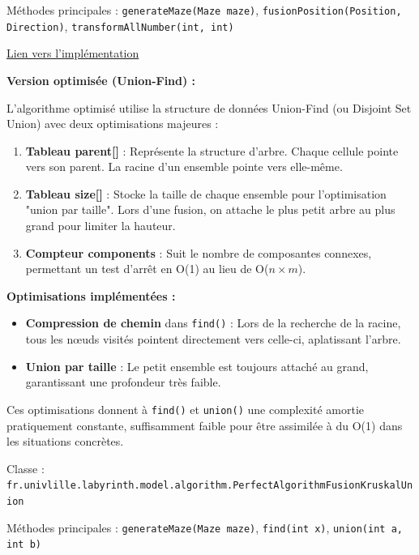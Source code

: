 \documentclass{butexFR}
\begin{document}
Méthodes principales : \texttt{generateMaze(Maze maze)}, \texttt{fusionPosition(Position, Direction)}, \texttt{transformAllNumber(int, int)}

\href{https://gitlab.univ-lille.fr/sae302/2025/G2_SAE3.3/-/blob/master/labyrinth/src/main/java/fr/univlille/labyrinth/model/algorithm/PerfectAlgorithmRandomFusion.java?ref_type=heads}{Lien vers l'implémentation}

\textbf{Version optimisée (Union-Find) :}

L'algorithme optimisé utilise la structure de données Union-Find (ou Disjoint Set Union) avec deux optimisations majeures :

\begin{enumerate}
    \item \textbf{Tableau parent[]} : Représente la structure d'arbre. Chaque cellule pointe vers son parent. La racine d'un ensemble pointe vers elle-même.

    \item \textbf{Tableau size[]} : Stocke la taille de chaque ensemble pour l'optimisation "union par taille". Lors d'une fusion, on attache le plus petit arbre au plus grand pour limiter la hauteur.

    \item \textbf{Compteur components} : Suit le nombre de composantes connexes, permettant un test d'arrêt en O(1) au lieu de O($n \times m$).
\end{enumerate}

\textbf{Optimisations implémentées :}
\begin{itemize}
    \item \textbf{Compression de chemin} dans \texttt{find()} : Lors de la recherche de la racine, tous les nœuds visités pointent directement vers celle-ci, aplatissant l'arbre.

    \item \textbf{Union par taille} : Le petit ensemble est toujours attaché au grand, garantissant une profondeur très faible.
\end{itemize}

Ces optimisations donnent à \texttt{find()} et \texttt{union()} une complexité amortie pratiquement constante, suffisamment faible pour être assimilée à du O(1) dans les situations concrètes.

Classe : \texttt{fr.univlille.labyrinth.model.algorithm.PerfectAlgorithmFusionKruskalUnion}

Méthodes principales : \texttt{generateMaze(Maze maze)}, \texttt{find(int x)}, \texttt{union(int a, int b)}
\end{document}
